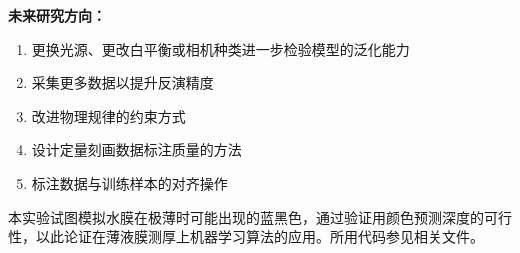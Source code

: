 \documentclass[11pt]{article}
\begin{document}
\textbf{未来研究方向：}
\begin{enumerate}
	\item 更换光源、更改白平衡或相机种类进一步检验模型的泛化能力
	\item 采集更多数据以提升反演精度
	\item 改进物理规律的约束方式
	\item 设计定量刻画数据标注质量的方法
	\item 标注数据与训练样本的对齐操作
	
\end{enumerate}

本实验试图模拟水膜在极薄时可能出现的蓝黑色，通过验证用颜色预测深度的可行性，以此论证在薄液膜测厚上机器学习算法的应用。所用代码参见相关文件。
\end{document}

